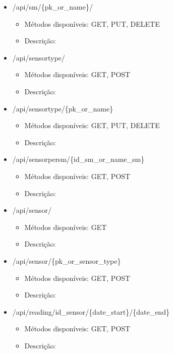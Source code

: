 \begin{itemize}
	
	\item /api/sm/\{pk\_or\_name\}/
	\begin{itemize}
		\item Métodos disponíveis: GET, PUT, DELETE
		\item Descrição: 
	\end{itemize}
	
	
	\item /api/sensortype/
	\begin{itemize}
		\item Métodos disponíveis: GET, POST
		\item Descrição: 
	\end{itemize}
	
	
	\item /api/sensortype/\{pk\_or\_name\}
	\begin{itemize}
		\item Métodos disponíveis: GET, PUT, DELETE
		\item Descrição: 
	\end{itemize}
	
	
	\item /api/sensorpersm/\{id\_sm\_or\_name\_sm\}
	\begin{itemize}
		\item Métodos disponíveis: GET, POST
		\item Descrição: 
	\end{itemize}
	
	
	\item /api/sensor/
	\begin{itemize}
		\item Métodos disponíveis: GET
		\item Descrição: 
	\end{itemize}
	
	
	\item /api/sensor/\{pk\_or\_sensor\_type\}
	\begin{itemize}
		\item Métodos disponíveis: GET, POST
		\item Descrição: 
	\end{itemize}
	
	
	\item /api/reading/{id\_sensor}/\{date\_start\}/\{date\_end\}
	\begin{itemize}
		\item Métodos disponíveis: GET, POST
		\item Descrição: 
	\end{itemize}
	

\end{itemize}
